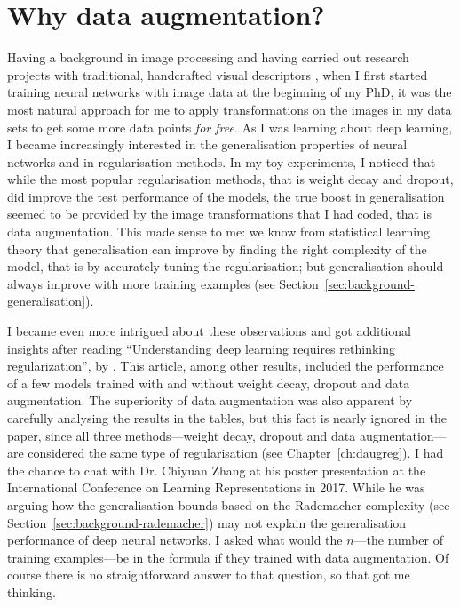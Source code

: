 {\section{Why data augmentation?}
Having a background in image processing and having carried out research projects with traditional, handcrafted visual descriptors \citep{hernandez2017mscthesis}, when I first started training neural networks with image data at the beginning of my PhD, it was the most natural approach for me to apply transformations on the images in my data sets to get some more data points \textit{for free}. As I was learning about deep learning, I became increasingly interested in the generalisation properties of neural networks and in regularisation methods. In my toy experiments, I noticed that while the most popular regularisation methods, that is weight decay and dropout, did improve the test performance of the models, the true boost in generalisation seemed to be provided by the image transformations that I had coded, that is data augmentation. This made sense to me: we know from statistical learning theory that generalisation can improve by finding the right complexity of the model, that is by accurately tuning the regularisation; but generalisation should always improve with more training examples (see Section~\ref{sec:background-generalisation}).

I became even more intrigued about these observations and got additional insights after reading ``Understanding deep learning requires rethinking regularization'', by \citet{zhang2016understandingdl}. This article, among other results, included the performance of a few models trained with and without weight decay, dropout and data augmentation. The superiority of data augmentation was also apparent by carefully analysing the results in the tables, but this fact is nearly ignored in the paper, since all three methods---weight decay, dropout and data augmentation---are considered the same type of regularisation (see Chapter~\ref{ch:daugreg}). I had the chance to chat with Dr. Chiyuan Zhang at his poster presentation at the International Conference on Learning Representations in 2017. While he was arguing how the generalisation bounds based on the Rademacher complexity (see Section~\ref{sec:background-rademacher}) may not explain the generalisation performance of deep neural networks, I asked what would the $n$---the number of training examples---be in the formula if they trained with data augmentation. Of course there is no straightforward answer to that question, so that got me thinking.

}
